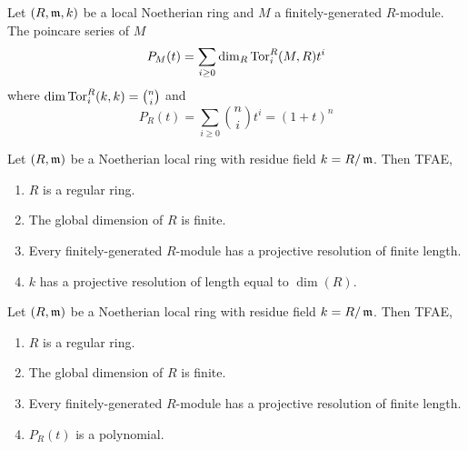 \documentclass[12pt]{amsart}
\begin{document}
\begin{theorem}
    Let $(R, \operatorname{\mathfrak{m}}, k)$ be a local Noetherian ring and $M$ a finitely-generated $R$-module. The poincare series of $M$ 
    \[P_M(t) = \sum_{i \geq 0} \dim_R \text{Tor}_i^R(M, R)t^i\]
    where $\dim \text{Tor}_i^R(k, k) = \binom{n}{i}$
    and \[P_R(t) = \sum_{i \geq 0} \binom{n}{i}t^i = (1+t)^n\]
\end{theorem}

\begin{theorem} 
    Let $(R, \operatorname{\mathfrak{m}})$ be a Noetherian local ring with residue field $k = R/\operatorname{\mathfrak{m}}$. Then TFAE, 
    \begin{enumerate}
        \item $R$ is a regular ring. 
        \item The global dimension of $R$ is finite. 
        \item Every finitely-generated $R$-module has a projective resolution of finite length. 
        \item $k$ has a projective resolution of length equal to $\dim(R)$. 
    \end{enumerate}
\end{theorem}


\begin{theorem} 
    Let $(R, \operatorname{\mathfrak{m}})$ be a Noetherian local ring with residue field $k = R/\operatorname{\mathfrak{m}}$. Then TFAE, 
    \begin{enumerate}
        \item $R$ is a regular ring. 
        \item The global dimension of $R$ is finite. 
        \item Every finitely-generated $R$-module has a projective resolution of finite length. 
        \item $P_R(t)$ is a polynomial. 
    \end{enumerate}
\end{theorem}
\end{document}
